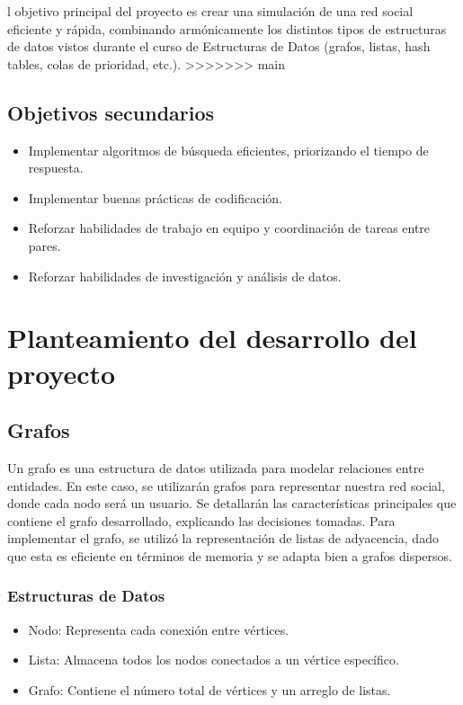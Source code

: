 \documentclass[9pt,letterpaper,onecolumn]{rho-class/rho}
\begin{document}
    l objetivo principal del proyecto es crear una simulación de una red social eficiente y rápida, combinando armónicamente los distintos tipos de estructuras de datos vistos durante el curso de Estructuras de Datos (grafos, listas, hash tables, colas de prioridad, etc.).
>>>>>>> main

    \subsection{Objetivos secundarios}
    \begin{itemize}
        \item Implementar algoritmos de búsqueda eficientes, priorizando el tiempo de respuesta.
        \item Implementar buenas prácticas de codificación.
        \item Reforzar habilidades de trabajo en equipo y coordinación de tareas entre pares.
        \item Reforzar habilidades de investigación y análisis de datos.
    \end{itemize}

\newpage
\section{Planteamiento del desarrollo del proyecto}

    \subsection{Grafos}
    Un grafo es una estructura de datos utilizada para modelar relaciones entre entidades.
    En este caso, se utilizarán grafos para representar nuestra red social, donde cada nodo será un usuario.
    Se detallarán las características principales que contiene el grafo desarrollado, explicando las decisiones tomadas. 
    Para implementar el grafo, se utilizó la representación de listas de adyacencia, dado que esta es eficiente en términos de memoria y se adapta bien a grafos dispersos.

    \subsubsection{Estructuras de Datos}
    \begin{itemize}
        \item Nodo: Representa cada conexión entre vértices.
        \item Lista: Almacena todos los nodos conectados a un vértice específico.
        \item Grafo: Contiene el número total de vértices y un arreglo de listas.
    \end{itemize}
\end{document}
